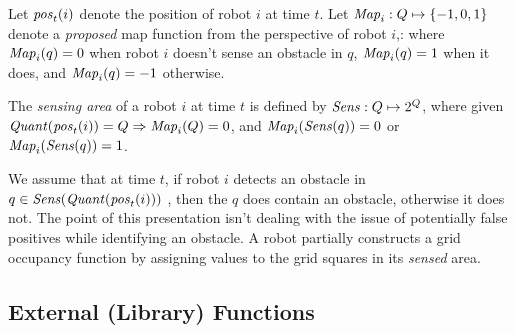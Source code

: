  Let $\mathit{pos}_t(i)$ denote the position of robot $i$ at time $t$. Let $\mathit{Map}_i:Q\mapsto \left\{-1,0,1\right\}$ denote a \emph{proposed} map function from the perspective of robot $i$,: where $\mathit{Map}_i(q) = 0$ when robot $i$ doesn't sense an obstacle in $q$, $\mathit{Map}_i(q) = 1$ when it does, and $\mathit{Map}_i(q) = -1$ otherwise. 
 \begin{definition} The \emph{sensing area} of a robot $i$ at time $t$ is defined by $\mathit{Sens}: Q \mapsto 2^{Q}$, where given $\mathit{Quant}(\mathit{pos}_t(i)) = Q \Rightarrow \mathit{Map}_i(Q) = 0$, and  $\mathit{Map}_i(\mathit{Sens}(q)) = 0$ or $\mathit{Map}_i(\mathit{Sens}(q)) = 1$. 
  \end{definition}
  
  
We assume that at time $t$, if robot $i$ detects an obstacle in $q \in \mathit{Sens}(\mathit{Quant}(\mathit{pos}_t(i)))$ , then the $q$ does contain an obstacle, otherwise it does not. The point of this presentation isn't dealing with the issue of potentially false positives while identifying an obstacle. A robot partially constructs a grid occupancy function by assigning values to the grid squares in its \emph{sensed} area.

 


\subsection{External (Library) Functions}

